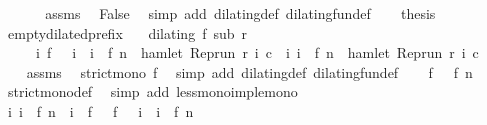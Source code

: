 \begin{isabellebody}
\ {\isacharminus}\ \isanewline
\ \ \isamarkupfalse%
\ assms\ \isamarkupfalse%
\ False\ \isamarkupfalse%
\ {\isacharparenleft}simp\ add{\isacharcolon}\ dilating{\isacharunderscore}def\ dilating{\isacharunderscore}fun{\isacharunderscore}def{\isacharparenright}\isanewline
\ \ \isamarkupfalse%
\ {\isacharquery}thesis\ \isacommand{{\isachardot}{\isachardot}}\isamarkupfalse%
\isanewline
{}\isamarkupfalse%
%
\endisatagproof
{\isafoldproof}%
%
\isadelimproof
\isanewline
%
\endisadelimproof
\isanewline
{}\isamarkupfalse%
\ empty{\isacharunderscore}dilated{\isacharunderscore}prefix{\isacharprime}{\isacharcolon}\isanewline
\ \ \ {\isacartoucheopen}dilating\ f\ sub\ r{\isacartoucheclose}\isanewline
\ \ \ \ \ {\isacartoucheopen}{\isacharbraceleft}i{\isachardot}\ f\ {}\ {\isasymle}\ i\ {\isasymand}\ i\ {\isasymle}\ f\ n\ {\isasymand}\ hamlet\ {\isacharparenleft}{\isacharparenleft}Rep{\isacharunderscore}run\ r{\isacharparenright}\ i\ c{\isacharparenright}{\isacharbraceright}\ {\isacharequal}\ {\isacharbraceleft}i{\isachardot}\ i\ {\isasymle}\ f\ n\ {\isasymand}\ hamlet\ {\isacharparenleft}{\isacharparenleft}Rep{\isacharunderscore}run\ r{\isacharparenright}\ i\ c{\isacharparenright}{\isacharbraceright}{\isacartoucheclose}\isanewline
%
\isadelimproof
%
\endisadelimproof
%
\isatagproof
{}\isamarkupfalse%
\ {\isacharminus}\isanewline
\ \ \isamarkupfalse%
\ assms\ \isamarkupfalse%
\ {\isacartoucheopen}strict{\isacharunderscore}mono\ f{\isacartoucheclose}\ \isamarkupfalse%
\ {\isacharparenleft}simp\ add{\isacharcolon}\ dilating{\isacharunderscore}def\ dilating{\isacharunderscore}fun{\isacharunderscore}def{\isacharparenright}\isanewline
\ \ \isamarkupfalse%
\ {\isacartoucheopen}f\ {}\ {\isasymle}\ f\ n{\isacartoucheclose}\ \isamarkupfalse%
\ strict{\isacharunderscore}mono{\isacharunderscore}def\ \isamarkupfalse%
\ {\isacharparenleft}simp\ add{\isacharcolon}\ less{\isacharunderscore}mono{\isacharunderscore}imp{\isacharunderscore}le{\isacharunderscore}mono{\isacharparenright}\isanewline
\ \ \isamarkupfalse%
\ {\isacartoucheopen}{\isasymforall}i{\isachardot}\ i\ {\isasymle}\ f\ n\ {\isacharequal}\ {\isacharparenleft}i\ {\isacharless}\ f\ {}{\isacharparenright}\ {\isasymor}\ {\isacharparenleft}f\ {}\ {\isasymle}\ i\ {\isasymand}\ i\ {\isasymle}\ f\ n{\isacharparenright}{\isacartoucheclose}\ \isamarkupfalse%

\end{isabellebody}
